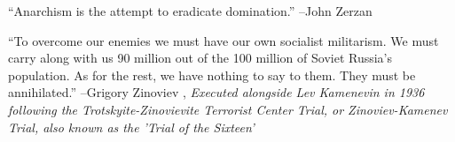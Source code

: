 \documentclass{article}%
\begin{document}
\linebreak%
\vspace{1mm}%
\begin{minipage}{\textwidth}%
\flushleft%
“Anarchism is the attempt to eradicate domination.”%
\linebreak%
\vspace{1mm}%
–John Zerzan%
\linebreak%
\vspace{1mm}%
\end{minipage}%
\linebreak%
\vspace{1mm}%
\begin{minipage}{\textwidth}%
\flushleft%
“To overcome our enemies we must have our own socialist militarism. We must carry along with us 90 million out of the 100 million of Soviet Russia's population. As for the rest, we have nothing to say to them. They must be annihilated.”%
\linebreak%
\vspace{1mm}%
–Grigory Zinoviev%
, \textit{Executed alongside Lev Kamenevin in 1936 following the Trotskyite-Zinovievite Terrorist Center Trial, or Zinoviev-Kamenev Trial, also known as the 'Trial of the Sixteen'}%
\linebreak%
\vspace{1mm}%
\end{minipage}%
\linebreak%
\vspace{1mm}

%
\end{document}
